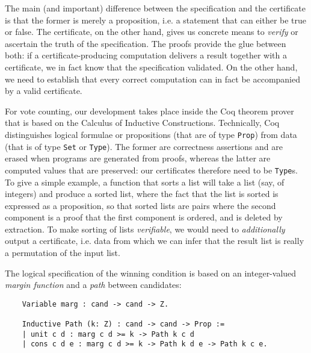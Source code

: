 \documentclass{llncs}
\begin{document}
The main (and important) difference between the specification and
the certificate is that the former is merely a proposition, i.e. a
statement that can either be true or false. The certificate, on the
other hand, gives us concrete means to \emph{verify} or ascertain
the truth of the specification. The proofs provide the glue between
both: if a certificate-producing computation delivers a result
together with a certificate, we in fact know that the
specification validated.  On the other hand, we need to establish
that every correct computation can in fact be accompanied by a valid
certificate. 

For vote counting,
our development takes place inside the Coq theorem prover
\cite{Bertot:2004:ITP} that is based on the Calculus of Inductive
Constructions. Technically, Coq distinguishes logical formulae or
propositions (that
are of type \texttt{Prop}) from data (that is of type \texttt{Set} or
\texttt{Type}). The former are correctness assertions and are erased
when programs are generated from proofs, whereas the latter
are computed values that are preserved: our certificates therefore
need to be \texttt{Type}s. To give a simple example, a
function that sorts a list will take a list (say, of integers) and
produce a sorted list, where the fact that the list is sorted is
expressed as a proposition, so that sorted lists are pairs where the
second component is a proof that the first component is ordered,
and is deleted by extraction. To make sorting of lists
\emph{verifiable}, we would need to \emph{additionally} output a
certificate, i.e. data
from which we can infer that the result list is really a permutation of
the input list.

The logical specification of the winning condition is based on an
integer-valued 
\emph{margin function} and a \emph{path} between candidates:
\begin{verbatim}    
	Variable marg : cand -> cand -> Z. 
	
	Inductive Path (k: Z) : cand -> cand -> Prop :=     
	| unit c d : marg c d >= k -> Path k c d     
	| cons c d e : marg c d >= k -> Path k d e -> Path k c e.
\end{verbatim}  
\end{document}

